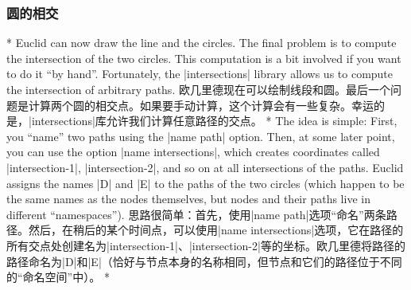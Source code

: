 \begin{paracol}{2}
\subsubsection{圆的相交}
\switchcolumn[0]*%
Euclid can now draw the line and the circles. The final problem is to compute
the intersection of the two circles. This computation is a bit involved if you
want to do it ``by hand''. Fortunately, the |intersections| library allows us
to compute the intersection of arbitrary paths.
\switchcolumn
欧几里德现在可以绘制线段和圆。最后一个问题是计算两个圆的相交点。如果要手动计算，这个计算会有一些复杂。幸运的是，|intersections|库允许我们计算任意路径的交点。
\switchcolumn[0]*%
The idea is simple: First, you ``name'' two paths using the |name path| option.
Then, at some later point, you can use the option |name intersections|, which
creates coordinates called |intersection-1|, |intersection-2|, and so on at all
intersections of the paths. Euclid assigns the names |D| and |E| to the paths
of the two circles (which happen to be the same names as the nodes themselves,
but nodes and their paths live in different ``namespaces'').
\switchcolumn
思路很简单：首先，使用|name path|选项“命名”两条路径。然后，在稍后的某个时间点，可以使用|name intersections|选项，它在路径的所有交点处创建名为|intersection-1|、|intersection-2|等的坐标。欧几里德将路径的路径命名为|D|和|E|（恰好与节点本身的名称相同，但节点和它们的路径位于不同的“命名空间”中）。
\switchcolumn[1]*%
\begin{codeexample}[preamble={\usetikzlibrary{intersections,through}}]
\end{codeexample}
\end{paracol}
